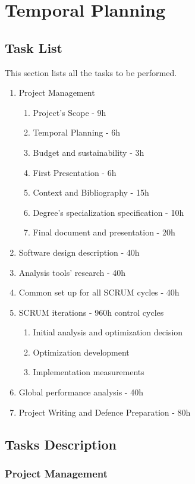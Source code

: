 \chapter{Temporal Planning}
\label{sec:temporal_planning}


\section{Task List}

This section lists all the tasks to be performed.

\begin{enumerate}
\item Project Management
\begin{enumerate}
\item Project's Scope - 9h
\item Temporal Planning - 6h
\item Budget and sustainability - 3h
\item First Presentation - 6h
\item Context and Bibliography - 15h
\item Degree's specialization specification - 10h
\item Final document and presentation - 20h
\end{enumerate}
\item Software design description - 40h
\item Analysis tools' research - 40h
\item Common set up for all SCRUM cycles - 40h
\item SCRUM iterations - 960h control cycles
\begin{enumerate}
\item Initial analysis and optimization decision
\item Optimization development
\item Implementation measurements
\end{enumerate}
\item Global performance analysis - 40h

\item Project Writing and Defence Preparation - 80h
\end{enumerate}

\section{Tasks Description}


\subsection{Project Management}

